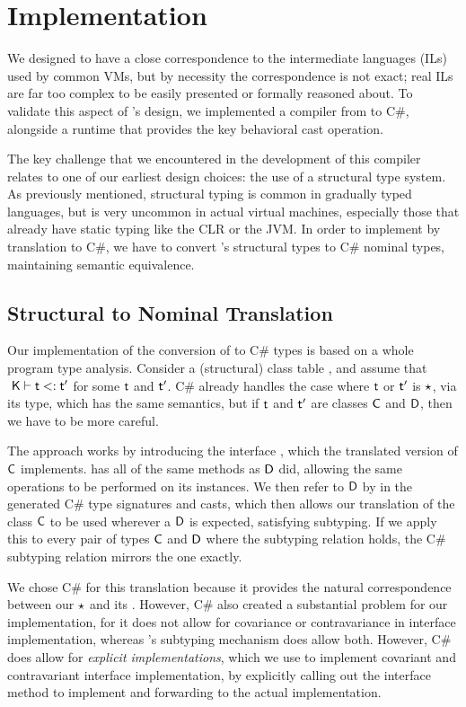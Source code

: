 \documentclass[acmlarge, anonymous, authordraft]{acmart}
\begin{document}
\section{Implementation} We designed \kafka to have a close correspondence to
the intermediate languages (ILs) used by common VMs, but by necessity the
correspondence is not exact; real ILs are far too complex to be easily
presented or formally reasoned about. To validate this aspect of \kafka's
design, we implemented a compiler from \kafka to C\#, alongside a runtime that
provides the key behavioral cast operation.

The key challenge that we encountered in the development of this compiler
relates to one of our earliest design choices: the use of a structural type
system. As previously mentioned, structural typing is common in gradually
typed languages, but is very uncommon in actual virtual machines, especially
those that already have static typing like the CLR or the JVM. In order to
implement \kafka by translation to C\#, we have to convert \kafka's structural
types to C\# nominal types, maintaining semantic equivalence.

\subsection{Structural to Nominal Translation} Our implementation of the
conversion of \kafka to C\# types is based on a whole program type analysis.
Consider a (structural) class table \K, and assume that $\StrSub{}\K\t\tp$ for
some $\t$ and $\tp$. C\# already handles the case where $\t$ or $\tp$ is
$\star$, via its  type, which has the same semantics, but if $\t$
and $\tp$ are classes ${\sf{C}}$ and ${\sf{D}}$, then we have to be more careful.

The approach works by introducing the interface , which the translated
version of ${\sf{C}}$ implements.  has all of the same methods as ${\sf{D}}$ did,
allowing the same operations to be performed on its instances. We then refer
to ${\sf{D}}$ by  in the generated C\# type signatures and casts, which then
allows our translation of the class ${\sf{C}}$ to be used wherever a ${\sf{D}}$ is
expected, satisfying subtyping. If we apply this to every pair of types ${\sf{C}}$
and ${\sf{D}}$ where the subtyping relation holds, the C\# subtyping relation
mirrors the \kafka one exactly.

We chose C\# for this translation because it provides the natural
correspondence between our $\star$ and its . However, C\# also
created a substantial problem for our implementation, for it does not allow
for covariance or contravariance in interface implementation, whereas \kafka's
subtyping mechanism does allow both. However, C\# does allow for
\emph{explicit implementations}, which we use to implement covariant and
contravariant interface implementation, by explicitly calling out the
interface method to implement and forwarding to the actual implementation.
\end{document}
